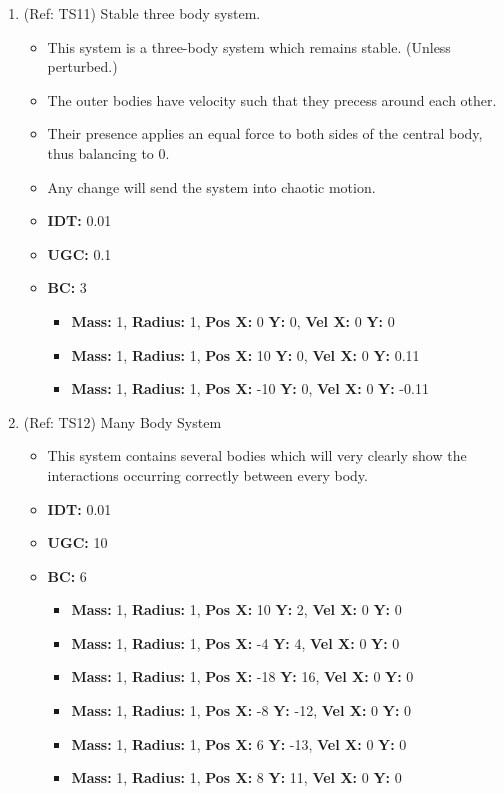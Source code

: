 \begin{enumerate}
\vspace{12pt}  
\item (Ref: TS11) Stable three body system.
  \begin{itemize}
  \item This system is a three-body system which remains stable. (Unless perturbed.)
  \item The outer bodies have velocity such that they precess around each other.
  \item Their presence applies an equal force to both sides of the central body, thus balancing to 0.
  \item Any change will send the system into chaotic motion.
  \item \textbf{IDT:} 0.01
  \item \textbf{UGC:} 0.1 
  \item \textbf{BC:} 3
    \begin{itemize}
    \item \textbf{Mass:} 1, \textbf{Radius:} 1, \textbf{Pos X:} 0 \textbf{Y:} 0, \textbf{Vel X:} 0 \textbf{Y:} 0
    \item \textbf{Mass:} 1, \textbf{Radius:} 1, \textbf{Pos X:} 10 \textbf{Y:} 0, \textbf{Vel X:} 0 \textbf{Y:} 0.11
    \item \textbf{Mass:} 1, \textbf{Radius:} 1, \textbf{Pos X:} -10 \textbf{Y:} 0, \textbf{Vel X:} 0 \textbf{Y:} -0.11
    \end{itemize}
  \end{itemize}
  
\pagebreak 
\item (Ref: TS12) Many Body System
  \begin{itemize}
  \item This system contains several bodies which will very clearly show the interactions occurring correctly between every body.
  \item \textbf{IDT:} 0.01
  \item \textbf{UGC:} 10
  \item \textbf{BC:} 6
    \begin{itemize}
    \item \textbf{Mass:} 1, \textbf{Radius:} 1, \textbf{Pos X:} 10 \textbf{Y:} 2, \textbf{Vel X:} 0 \textbf{Y:} 0
    \item \textbf{Mass:} 1, \textbf{Radius:} 1, \textbf{Pos X:} -4 \textbf{Y:} 4, \textbf{Vel X:} 0 \textbf{Y:} 0
    \item \textbf{Mass:} 1, \textbf{Radius:} 1, \textbf{Pos X:} -18 \textbf{Y:} 16, \textbf{Vel X:} 0 \textbf{Y:} 0
    \item \textbf{Mass:} 1, \textbf{Radius:} 1, \textbf{Pos X:} -8 \textbf{Y:} -12, \textbf{Vel X:} 0 \textbf{Y:} 0
    \item \textbf{Mass:} 1, \textbf{Radius:} 1, \textbf{Pos X:} 6 \textbf{Y:} -13, \textbf{Vel X:} 0 \textbf{Y:} 0
    \item \textbf{Mass:} 1, \textbf{Radius:} 1, \textbf{Pos X:} 8 \textbf{Y:} 11, \textbf{Vel X:} 0 \textbf{Y:} 0
    \end{itemize}
  \end{itemize}
\end{enumerate}

